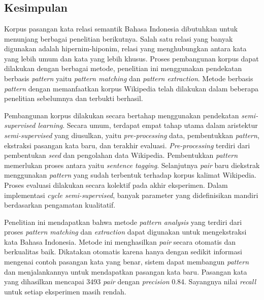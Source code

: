 \chapter{\babEnam}

\section{Kesimpulan}
Korpus pasangan kata relasi semantik Bahasa Indonesia dibutuhkan untuk menunjang berbagai penelitian berikutnya. Salah satu relasi yang banyak digunakan adalah hipernim-hiponim, relasi yang menghubungkan antara kata yang lebih umum dan kata yang lebih khusus. Proses pembangunan korpus dapat dilakukan dengan berbagai metode, penelitian ini menggunakan pendekatan berbasis \textit{pattern} yaitu \textit{pattern matching} dan \textit{pattern extraction}. Metode berbasis \textit{pattern} dengan memanfaatkan korpus Wikipedia telah dilakukan dalam beberapa penelitian sebelumnya dan terbukti berhasil. 

Pembangunan korpus dilakukan secara bertahap menggunakan pendekatan \textit{semi-supervised learning}. Secara umum, terdapat empat tahap utama dalam aristektur \textit{semi-supervised} yang diusulkan, yaitu \textit{pre-processing} data, pembentukkan \textit{pattern}, ekstraksi pasangan kata baru, dan terakhir evaluasi. \textit{Pre-processing} terdiri dari pembentukan \textit{seed} dan pengolahan data Wikipedia. Pembentukkan \textit{pattern} memerlukan proses antara yaitu \textit{sentence tagging}. Selanjutnya \textit{pair} baru diekstrak menggunakan \textit{pattern} yang sudah terbentuk terhadap korpus kalimat Wikipedia. Proses evaluasi dilakukan secara kolektif pada akhir eksperimen. Dalam implementasi \textit{cycle semi-supervised}, banyak parameter yang didefinisikan mandiri berdasarkan pengamatan kualitatif.

Penelitian ini mendapatkan bahwa metode \textit{pattern analysis} yang terdiri dari proses \textit{pattern matching} dan \textit{extraction} dapat digunakan untuk mengekstraksi kata Bahasa Indonesia. Metode ini menghasilkan \textit{pair} secara otomatis dan berkualitas baik. Dikatakan otomatis karena hanya dengan sedikit informasi mengenai contoh pasangan kata yang benar, sistem dapat membangun \textit{pattern} dan menjalankannya untuk mendapatkan pasangan kata baru. Pasangan kata yang dihasilkan mencapai 3493 \textit{pair} dengan \textit{precision} 0.84. Sayangnya nilai \textit{recall} untuk setiap eksperimen masih rendah.

